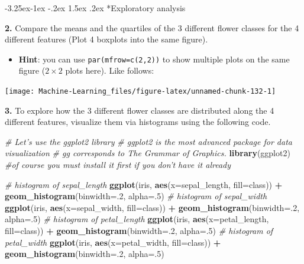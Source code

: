 \documentclass[]{book}
\makeatletter
\newenvironment{Shaded}{\begin{snugshade}}{\end{snugshade}}
\newcommand{\KeywordTok}[1]{\textcolor[rgb]{0.13,0.29,0.53}{\textbf{#1}}}
\newcommand{\DataTypeTok}[1]{\textcolor[rgb]{0.13,0.29,0.53}{#1}}
\newcommand{\DecValTok}[1]{\textcolor[rgb]{0.00,0.00,0.81}{#1}}
\newcommand{\StringTok}[1]{\textcolor[rgb]{0.31,0.60,0.02}{#1}}
\newcommand{\CommentTok}[1]{\textcolor[rgb]{0.56,0.35,0.01}{\textit{#1}}}
\newcommand{\OperatorTok}[1]{\textcolor[rgb]{0.81,0.36,0.00}{\textbf{#1}}}
\newcommand{\NormalTok}[1]{#1}
\newenvironment{rmdblock}[1]
  {\begin{shaded*}
  \begin{itemize}
  \renewcommand{\labelitemi}{
    \raisebox{-.7\height}[0pt][0pt]{
      {\setkeys{Gin}{width=2em,keepaspectratio}\texttt{[image: img/icons/\#1]}}
    }
  }
  \item
  }
  {
  \end{itemize}
  \end{shaded*}
  }
\newenvironment{rmdtip}
  {\begin{rmdblock}{tip}}
  {\end{rmdblock}}
\renewcommand\subsection{\@startsection{subsection}{2}{\z@}%
                                     {-3.25ex\@plus -1ex \@minus -.2ex}%
                                     {1.5ex \@plus .2ex}%
                                     {\normalfont\large\bfseries\color{Violet}}}
\theoremstyle{definition}
\theoremstyle{definition}
\theoremstyle{definition}
\theoremstyle{remark}
\makeatother
\begin{document}
\subsection*{Exploratory analysis}\label{exploratory-analysis}

\textbf{2.} Compare the means and the quartiles of the 3 different
flower classes for the 4 different features (Plot 4 boxplots into the
same figure).

\begin{rmdtip}
\textbf{Hint}: you can use \texttt{par(mfrow=c(2,2))} to show multiple
plots on the same figure (\(2 \times 2\) plots here). Like follows:
\end{rmdtip}

\begin{center}\texttt{[image: Machine-Learning\_files/figure-latex/unnamed-chunk-132-1]} \end{center}

\textbf{3.} To explore how the 3 different flower classes are
distributed along the 4 different features, visualize them via
histograms using the following code.

\begin{Shaded}
\begin{Highlighting}[]
\CommentTok{# Let's use the ggplot2 library}
\CommentTok{# ggplot2 is the most advanced package for data visualization}
\CommentTok{# gg corresponds to The Grammar of Graphics.}
\KeywordTok{library}\NormalTok{(ggplot2) }\CommentTok{#of course you must install it first if you don't have it already}

\CommentTok{# histogram of sepal_length}
\KeywordTok{ggplot}\NormalTok{(iris, }\KeywordTok{aes}\NormalTok{(}\DataTypeTok{x=}\NormalTok{sepal_length, }\DataTypeTok{fill=}\NormalTok{class)) }\OperatorTok{+}
\StringTok{  }\KeywordTok{geom_histogram}\NormalTok{(}\DataTypeTok{binwidth=}\NormalTok{.}\DecValTok{2}\NormalTok{, }\DataTypeTok{alpha=}\NormalTok{.}\DecValTok{5}\NormalTok{)}
\CommentTok{# histogram of sepal_width}
\KeywordTok{ggplot}\NormalTok{(iris, }\KeywordTok{aes}\NormalTok{(}\DataTypeTok{x=}\NormalTok{sepal_width, }\DataTypeTok{fill=}\NormalTok{class)) }\OperatorTok{+}
\StringTok{  }\KeywordTok{geom_histogram}\NormalTok{(}\DataTypeTok{binwidth=}\NormalTok{.}\DecValTok{2}\NormalTok{, }\DataTypeTok{alpha=}\NormalTok{.}\DecValTok{5}\NormalTok{)}
\CommentTok{# histogram of petal_length}
\KeywordTok{ggplot}\NormalTok{(iris, }\KeywordTok{aes}\NormalTok{(}\DataTypeTok{x=}\NormalTok{petal_length, }\DataTypeTok{fill=}\NormalTok{class)) }\OperatorTok{+}
\StringTok{  }\KeywordTok{geom_histogram}\NormalTok{(}\DataTypeTok{binwidth=}\NormalTok{.}\DecValTok{2}\NormalTok{, }\DataTypeTok{alpha=}\NormalTok{.}\DecValTok{5}\NormalTok{)}
\CommentTok{# histogram of petal_width}
\KeywordTok{ggplot}\NormalTok{(iris, }\KeywordTok{aes}\NormalTok{(}\DataTypeTok{x=}\NormalTok{petal_width, }\DataTypeTok{fill=}\NormalTok{class)) }\OperatorTok{+}
\StringTok{  }\KeywordTok{geom_histogram}\NormalTok{(}\DataTypeTok{binwidth=}\NormalTok{.}\DecValTok{2}\NormalTok{, }\DataTypeTok{alpha=}\NormalTok{.}\DecValTok{5}\NormalTok{)}
\end{Highlighting}
\end{Shaded}
\end{document}
